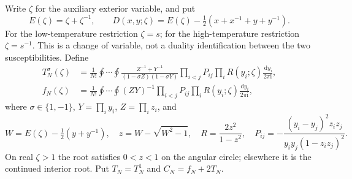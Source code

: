 \documentclass[11pt]{article}
\numberwithin{equation}{section}
\theoremstyle{definition}
\newcommand{\ii}{\mathrm i}
\newcommand{\dd}{\,\mathrm d}
\begin{document}
Write $\zeta$ for the auxiliary exterior variable, and put
\[
 E(\zeta)=\zeta+\zeta^{-1},\qquad
 D(x,y;\zeta)=E(\zeta)-\tfrac12(x+x^{-1}+y+y^{-1}).
\]
For the low-temperature restriction $\zeta=s$; for the high-temperature
restriction $\zeta=s^{-1}$. This is a change of variable, not a duality
identification between the two susceptibilities. Define
\begin{align}
 T_N^\sigma(\zeta)
 &=\frac1{N!}\oint\cdots\oint
 \frac{Z^{-1}+Y^{-1}}{(1-\sigma Z)(1-\sigma Y)}
 \prod_{i<j}P_{ij}\prod_i R(y_i;\zeta)\frac{\dd y_i}{2\pi\ii},
 \label{iso:reduced}\\
 f_N(\zeta)
 &=\frac1{N!}\oint\cdots\oint
 (ZY)^{-1}\prod_{i<j}P_{ij}\prod_iR(y_i;\zeta)\frac{\dd y_i}{2\pi\ii},
 \label{iso:onsite}
\end{align}
where $\sigma\in\{1,-1\}$, $Y=\prod_i y_i$, $Z=\prod_i z_i$, and
\[
 W=E(\zeta)-\tfrac12(y+y^{-1}),\quad
 z=W-\sqrt{W^2-1},\quad R=\frac{2z^2}{1-z^2},\quad
 P_{ij}=-\frac{(y_i-y_j)^2z_i z_j}{y_i y_j(1-z_i z_j)^2}.
\]
On real $\zeta>1$ the root satisfies $0<z<1$ on the angular circle;
elsewhere it is the continued interior root. Put $T_N=T_N^1$ and
$C_N=f_N+2T_N$.
\end{document}
